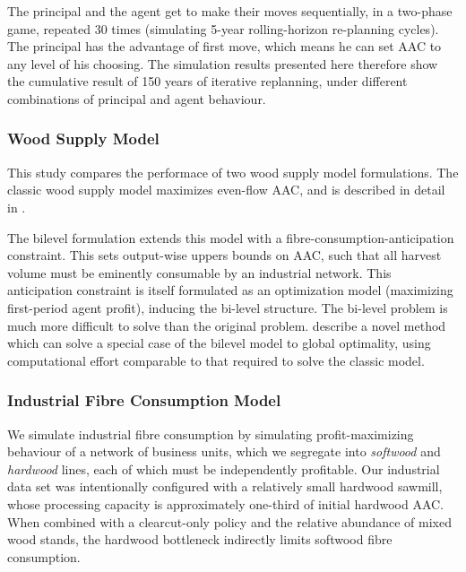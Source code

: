 The principal and the agent get to make their moves sequentially, in a two-phase game, repeated 30 times (simulating 5-year rolling-horizon re-planning cycles). The principal has the advantage of first move, which means he can set AAC to any level of his choosing. The simulation results presented here therefore show the cumulative result of 150 years of iterative replanning, under different combinations of principal and agent behaviour. 

\subsubsection{Wood Supply Model}

This study compares the performace of two wood supply model formulations. The classic wood supply model maximizes even-flow AAC, and is described in detail in \citet{paradis2013risk}. 

The bilevel formulation extends this model with a fibre-consumption-anticipation constraint. This sets output-wise uppers bounds on AAC, such that all harvest volume must be eminently consumable by an industrial network. This anticipation constraint is itself formulated as an optimization model (maximizing first-period agent profit), inducing the bi-level structure. The bi-level problem is much more difficult to solve than the original problem.  \citet{paradis2014bilevel} describe a novel method which can solve a special case of the bilevel model to global optimality, using computational effort comparable to that required to solve the classic model.

\subsubsection{Industrial Fibre Consumption Model}

We simulate industrial fibre consumption by simulating profit-maximizing behaviour of a network of business units, which we segregate into \emph{softwood} and \emph{hardwood} lines, each of which must be independently profitable. Our industrial data set was intentionally configured with a relatively small hardwood sawmill, whose processing capacity is approximately one-third of initial hardwood AAC. When combined with a clearcut-only policy and the relative abundance of mixed wood stands, the hardwood bottleneck indirectly limits softwood fibre consumption. 

